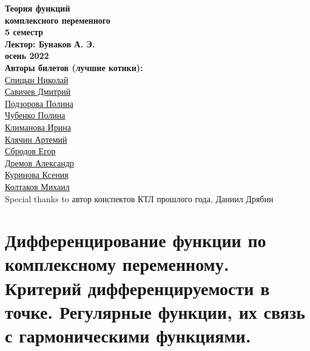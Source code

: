 


    \thispagestyle{empty}
    \BgThispage
    \begin{center}
        \vspace*{4cm}
        
        \Huge
        \textbf{Теория функций\\комплексного переменного } \\
        \textbf{5 семестр} \\
        \textbf{Лектор: Бунаков А. Э.} \\
        \textbf{осень 2022} \\
        
        \vspace{6cm}
        \Large
        \textbf{Авторы билетов (лучшие котики):} \\
        \href{https://vk.com/spitsynn}{Спицын Николай} \\
        \href{https://vk.com/dimasav123}{Савичев Дмитрий} \\
        \href{https://vk.com/id165779384}{Подзорова Полина} \\
        \href{https://vk.com/poli.dobro}{Чубенко Полина} \\        
        \href{https://vk.com/meraklim}{Климанова Ирина} \\
        \href{https://vk.com/artemiy.kliachin}{Клячин Артемий} \\
        \href{https://vk.com/ulegor}{Сбродов Егор} \\
        \href{https://vk.com/aldrmv}{Дремов Александр} \\
        \href{https://vk.com/ksinomorph}{Куринова Ксения} \\
        \href{https://vk.com/id153425653}{Колтаков Михаил} \\
        Special thanks to автор конспектов КТЛ прошлого года, Даниил Дрябин
        
    \end{center}

\newpage

\tableofcontents
\newpage


\section{Дифференцирование функции по комплексному переменному. Критерий дифференцируемости в точке. Регулярные функции, их связь с гармоническими функциями.}


